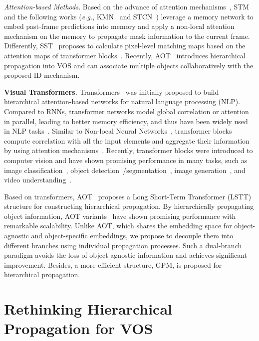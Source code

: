\documentclass{article}
\def\eg{\emph{e.g.}}
\begin{document}
\textit{Attention-based Methods.} Based on the advance of attention mechanisms~\cite{att,transformer,nonlocal}, STM~\cite{spacetime} and the following works (\eg, KMN~\cite{KMN} and STCN~\cite{cheng2021stcn}) leverage a memory network to embed past-frame predictions into memory and apply a non-local attention mechanism on the memory to propagate mask information to the current frame. Differently, SST~\cite{sstvos} proposes to calculate pixel-level matching maps based on the attention maps of transformer blocks~\cite{transformer}. Recently, AOT~\cite{aot,aot_workshop,aost} introduces hierarchical propagation into VOS and can associate multiple objects collaboratively with the proposed ID mechanism. 

\noindent\textbf{Visual Transformers.} Transformers~\cite{transformer} was initially proposed to build hierarchical attention-based networks for natural language processing (NLP). Compared to RNNs, transformer networks model global correlation or attention in parallel, leading to better memory efficiency, and thus have been widely used in NLP tasks~\cite{devlin2018bert,radford2019language,synnaeve2019end}. Similar to Non-local Neural Networks~\cite{nonlocal}, transformer blocks compute correlation with all the input elements and aggregate their information by using attention mechanisms~\cite{att}. Recently, transformer blocks were introduced
to computer vision and have shown promising performance in many tasks, such as image classification~\cite{vit,vaswani2021scaling,swin}, object detection~\cite{detr}/segmentation~\cite{vistr,zhu2022instance,pan2022n,liang2022local}, image generation~\cite{parmar2018image}, and video understanding~\cite{arnab2021vivit,videoswin,Liang_2022_CVPR}.

Based on transformers, AOT~\cite{aot} proposes a Long Short-Term Transformer (LSTT) structure for constructing hierarchical propagation. By hierarchically propagating object information, AOT variants~\cite{aot} have shown promising performance with remarkable scalability. Unlike AOT, which shares the embedding space for object-agnostic and object-specific embeddings, we propose to decouple them into different branches using individual propagation processes. Such a dual-branch paradigm avoids the loss of object-agnostic information and achieves significant improvement. Besides, a more efficient structure, GPM, is proposed for hierarchical propagation.


 
\section{Rethinking Hierarchical Propagation for VOS}
\end{document}
